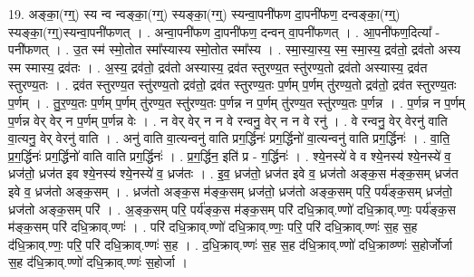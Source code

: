 \documentclass[17pt]{extarticle}
\begin{document}
19. अङ्का॒(ग्ग्॒) स्य न्व न्वङ्का॒(ग्ग्॒) स्यङ्का॒(ग्ग्॒) स्यन्वा॒पनी॑फण दा॒पनी॑फण॒ दन्वङ्का॒(ग्ग्॒) स्यङ्का॒(ग्ग्॒)स्यन्वा॒पनी॑फणत् । . अन्वा॒पनी॑फण दा॒पनी॑फण॒ दन्वन् वा॒पनी॑फणत् । . आ॒पनी॑फण॒दित्या᳚ - पनी॑फणत् । . उ॒त स्म॑ स्मो॒तोत स्मा᳚स्यास्य स्मो॒तोत स्मा᳚स्य । . स्मा॒स्या॒स्य॒ स्म॒ स्मा॒स्य॒ द्रव॑तो॒ द्रव॑तो अस्य स्म स्मास्य॒ द्रव॑तः । . अ॒स्य॒ द्रव॑तो॒ द्रव॑तो अस्यास्य॒ द्रव॑त स्तुरण्य॒त स्तु॑रण्य॒तो द्रव॑तो अस्यास्य॒ द्रव॑त स्तुरण्य॒तः । . द्रव॑त स्तुरण्य॒त स्तु॑रण्य॒तो द्रव॑तो॒ द्रव॑त स्तुरण्य॒तः प॒र्णम् प॒र्णम् तु॑रण्य॒तो द्रव॑तो॒ द्रव॑त स्तुरण्य॒तः प॒र्णम् । . तु॒र॒ण्य॒तः प॒र्णम् प॒र्णम् तु॑रण्य॒त स्तु॑रण्य॒तः प॒र्णन्न न प॒र्णम् तु॑रण्य॒त स्तु॑रण्य॒तः प॒र्णन्न । . प॒र्णन्न न प॒र्णम् प॒र्णन्न वेर् वेर् न प॒र्णम् प॒र्णन्न वेः । . न वेर् वेर् न न वे रन्वनु॒ वेर् न न वे रनु॑ । . वे रन्वनु॒ वेर् वेरनु॑ वाति वा॒त्यनु॒ वेर् वेरनु॑ वाति । . अनु॑ वाति वा॒त्यन्वनु॑ वाति प्रग॒र्द्धिनः॑ प्रग॒र्द्धिनो॑ वा॒त्यन्वनु॑ वाति प्रग॒र्द्धिनः॑ । . वा॒ति॒ प्र॒ग॒र्द्धिनः॑ प्रग॒र्द्धिनो॑ वाति वाति प्रग॒र्द्धिनः॑ । . प्र॒ग॒र्द्धिन॒ इति॑ प्र - ग॒र्द्धिनः॑ । . श्ये॒नस्ये॑ वे व श्ये॒नस्य॑ श्ये॒नस्ये॑ व॒ ध्रज॑तो॒ ध्रज॑त इव श्ये॒नस्य॑ श्ये॒नस्ये॑ व॒ ध्रज॑तः । . इ॒व॒ ध्रज॑तो॒ ध्रज॑त इवे व॒ ध्रज॑तो अङ्क॒स म॑ङ्क॒सम् ध्रज॑त इवे व॒ ध्रज॑तो अङ्क॒सम् । . ध्रज॑तो अङ्क॒स म॑ङ्क॒सम् ध्रज॑तो॒ ध्रज॑तो अङ्क॒सम् परि॒ पर्य॑ङ्क॒सम् ध्रज॑तो॒ ध्रज॑तो अङ्क॒सम् परि॑ । . अ॒ङ्क॒सम् परि॒ पर्य॑ङ्क॒स म॑ङ्क॒सम् परि॑ दधि॒क्राव्.ण्णो॑ दधि॒क्राव्.ण्णः॒ पर्य॑ङ्क॒स म॑ङ्क॒सम् परि॑ दधि॒क्राव्.ण्णः॑ । . परि॑ दधि॒क्राव्.ण्णो॑ दधि॒क्राव्.ण्णः॒ परि॒ परि॑ दधि॒क्राव्.ण्णः॑ स॒ह स॒ह द॑धि॒क्राव्.ण्णः॒ परि॒ परि॑ दधि॒क्राव्.ण्णः॑ स॒ह । . द॒धि॒क्राव्.ण्णः॑ स॒ह स॒ह द॑धि॒क्राव्.ण्णो॑ दधि॒क्राव्ण्णः॑ स॒होर्जोर्जा स॒ह द॑धि॒क्राव्.ण्णो॑ दधि॒क्राव्.ण्णः॑ स॒होर्जा । \newline
\end{document}
